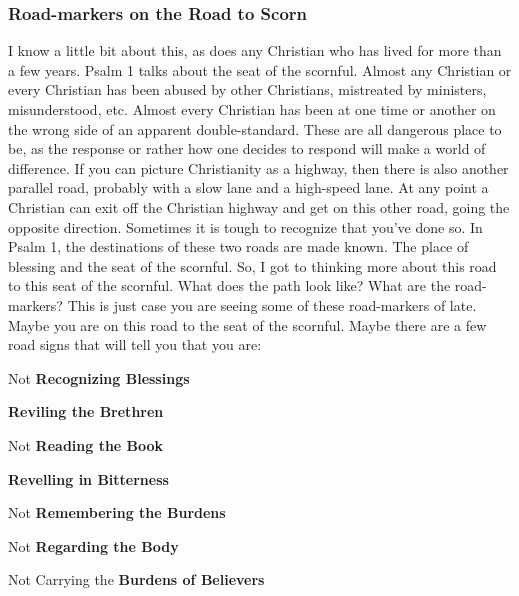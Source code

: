 \subsubsection{Road-markers on the Road to Scorn}
I know a little bit about this, as does any Christian who has lived for more than a few years. Psalm 1 talks about the seat of the scornful.  Almost any Christian or every Christian has been abused by other Christians, mistreated by ministers, misunderstood, etc. Almost every Christian has been at one time or another on the wrong side of an apparent double-standard. These  are all dangerous place to be, as the response or rather how one decides to respond will make a world of difference. If you can picture Christianity as a highway, then there is also another parallel road, probably with a slow lane and a high-speed lane. At any point a Christian can exit off the Christian highway and get on this other road, going the opposite direction. Sometimes it is tough to recognize that you've done so. In Psalm 1, the destinations of these two roads are made known.  The place of blessing and the seat of the scornful. So, I got to thinking more about this road to this seat of the scornful.  What does the path look like?  What are the road-markers? This is just case you are seeing some of these road-markers of late.  Maybe you are on this road to the seat of the scornful. Maybe there are a few road signs that will tell you that you are: 
\begin{compactenum}[I.]
    \item Not \textbf{Recognizing Blessings}
    \item \textbf{Reviling the Brethren}
    \item Not \textbf{Reading the Book}
    \item \textbf{Revelling in Bitterness}
    \item Not \textbf{Remembering the Burdens}
    \item Not \textbf{Regarding the Body}
    \item Not Carrying the \textbf{Burdens of Believers}
\end{compactenum}

